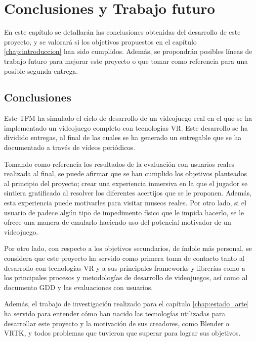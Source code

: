 \chapter{Conclusiones y Trabajo futuro}
\label{chap:conclusiones}

En este capítulo se detallarán las conclusiones obtenidas del desarrollo de este proyecto, y se valorará si los objetivos propuestos en el capítulo \ref{chap:introduccion} han sido cumplidos. Además, se propondrán posibles líneas de trabajo futuro para mejorar este proyecto o que tomar como referencia para una posible segunda entrega.

\section{Conclusiones}

Este \acs{TFM} ha simulado el ciclo de desarrollo de un videojuego real en el que se ha implementado un videojuego completo con tecnologías \acs{VR}. Este desarrollo se ha dividido entregas, al final de las cuales se ha generado un entregable que se ha documentado a través de vídeos periódicos.

Tomando como referencia los resultados de la evaluación con usuarios reales realizada al final, se puede afirmar que se han cumplido los objetivos planteados al principio del proyecto; crear una experiencia inmersiva en la que el jugador se sintiera gratificado al resolver los diferentes acertijos que se le proponen. Además, esta experiencia puede motivarles para visitar museos reales. Por otro lado, si el usuario de \MineRVa padece algún tipo de impedimento físico que le impida hacerlo, se le ofrece una manera de emularlo haciendo uso del potencial motivador de un videojuego.

Por otro lado, con respecto a los objetivos secundarios, de índole más personal, se considera que este proyecto ha servido como primera toma de contacto tanto al desarrollo con tecnologías \acs{VR} y a sus principales frameworks y librerías como a los principales procesos y metodologías de desarrollo de videojuegos, así como al documento \acs{GDD} y las evaluaciones con usuarios.

Además, el trabajo de investigación realizado para el capítulo \ref{chap:estado_arte} ha servido para entender cómo han nacido las tecnologías utilizadas para desarrollar este proyecto y la motivación de sus creadores, como Blender o \acs{VRTK}, y todos problemas que tuvieron que superar para lograr sus objetivos.

